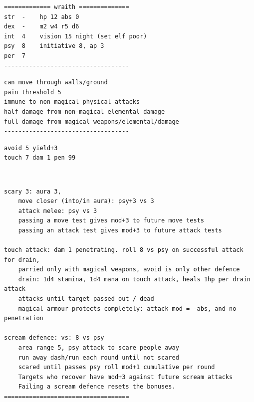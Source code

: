 \small \begin{samepage} \begin{verbatim}
============= wraith ==============
str  -    hp 12 abs 0
dex  -    m2 w4 r5 d6
int  4    vision 15 night (set elf poor)
psy  8    initiative 8, ap 3
per  7
-----------------------------------
\end{verbatim} \end{samepage} \goodbreak \begin{samepage} \begin{verbatim}
can move through walls/ground
pain threshold 5
immune to non-magical physical attacks
half damage from non-magical elemental damage
full damage from magical weapons/elemental/damage
-----------------------------------
\end{verbatim} \end{samepage} \goodbreak \begin{samepage} \begin{verbatim}
avoid 5 yield+3
touch 7 dam 1 pen 99
\end{verbatim} \end{samepage}   \   \goodbreak \begin{samepage} \begin{verbatim}
scary 3: aura 3,
    move closer (into/in aura): psy+3 vs 3
    attack melee: psy vs 3
    passing a move test gives mod+3 to future move tests
    passing an attack test gives mod+3 to future attack tests

touch attack: dam 1 penetrating. roll 8 vs psy on successful attack for drain,
    parried only with magical weapons, avoid is only other defence
    drain: 1d4 stamina, 1d4 mana on touch attack, heals 1hp per drain attack
    attacks until target passed out / dead
    magical armour protects completely: attack mod = -abs, and no penetration

scream defence: vs: 8 vs psy
    area range 5, psy attack to scare people away
    run away dash/run each round until not scared
    scared until passes psy roll mod+1 cumulative per round
    Targets who recover have mod+3 against future scream attacks
    Failing a scream defence resets the bonuses.
===================================
\end{verbatim} \end{samepage} \normalsize
























